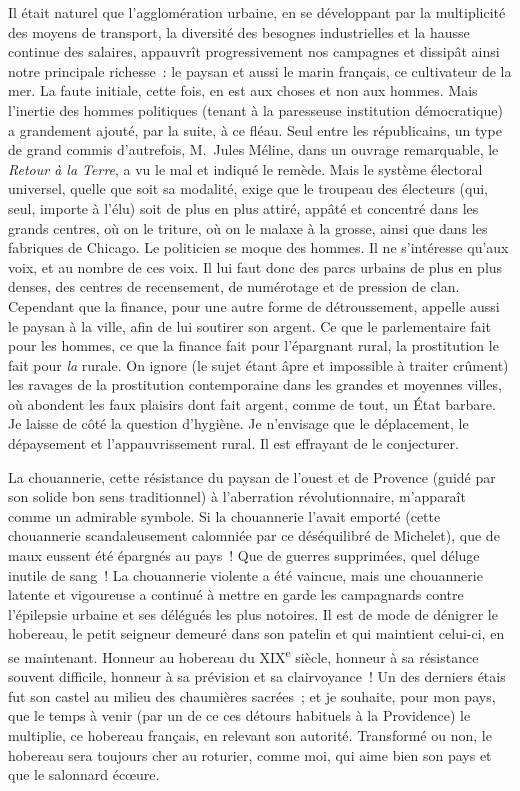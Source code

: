 \documentclass[french,twoside]{book} %
\begin{document}
Il était naturel que l’agglomération urbaine, en se développant par la multiplicité des moyens de transport, la diversité des besognes industrielles et la hausse continue des salaires, appauvrît progressivement nos campagnes et dissipât ainsi notre principale richesse : le paysan et aussi le marin français, ce cultivateur de la mer. La faute initiale, cette fois, en est aux choses et non aux hommes. Mais l’inertie des hommes politiques (tenant à la paresseuse institution démocratique) a grandement ajouté, par la suite, à ce fléau. Seul entre les républicains, un type de grand commis d’autrefois, M. Jules Méline, dans un ouvrage remarquable, le {\itshape Retour à la Terre}, a vu le mal et indiqué le remède. Mais le système électoral universel, quelle que soit sa modalité, exige que le troupeau des électeurs (qui, seul, importe à l’élu) soit de plus en plus attiré, appâté et concentré dans les grands centres, où on le triture, où on le malaxe à la grosse, ainsi que dans les fabriques de Chicago. Le politicien se moque des hommes. Il ne s’intéresse qu’aux voix, et au nombre de ces voix. Il lui faut donc des parcs urbains de plus en plus denses, des centres de recensement, de numérotage et de pression de clan. Cependant que la finance, pour une autre forme de détroussement, appelle aussi le paysan à la ville, afin de lui soutirer son argent. Ce que le parlementaire fait pour les hommes, ce que la finance fait pour l’épargnant rural, la prostitution le fait pour {\itshape la} rurale. On ignore (le sujet étant âpre et impossible à traiter crûment) les ravages de la prostitution contemporaine dans les grandes et moyennes villes, où abondent les faux plaisirs dont fait argent, comme de tout, un État barbare. Je laisse de côté la question d’hygiène. Je n’envisage que le déplacement, le dépaysement et l’appauvrissement rural. Il est effrayant de le conjecturer.\par
La chouannerie, cette résistance du paysan de l’ouest et de Provence (guidé par son solide bon sens traditionnel) à l’aberration révolutionnaire, m’apparaît comme un admirable symbole. Si la chouannerie l’avait emporté (cette chouannerie scandaleusement calomniée par ce déséquilibré de Michelet), que de maux eussent été épargnés au pays ! Que de guerres supprimées, quel déluge inutile de sang ! La chouannerie violente a été vaincue, mais une chouannerie latente et vigoureuse a continué à mettre en garde les campagnards contre l’épilepsie urbaine et ses délégués les plus notoires. Il est de mode de dénigrer le hobereau, le petit seigneur demeuré dans son patelin et qui maintient celui-ci, en se maintenant. Honneur au hobereau du XIX\textsuperscript{e} siècle, honneur à sa résistance souvent difficile, honneur à sa prévision et sa clairvoyance ! Un des derniers étais fut son castel au milieu des chaumières sacrées ; et je souhaite, pour mon pays, que le temps à venir (par un de ce ces détours habituels à la Providence) le multiplie, ce hobereau français, en relevant son autorité. Transformé ou non, le hobereau sera toujours cher au roturier, comme moi, qui aime bien son pays et que le salonnard écœure.\par
\end{document}
